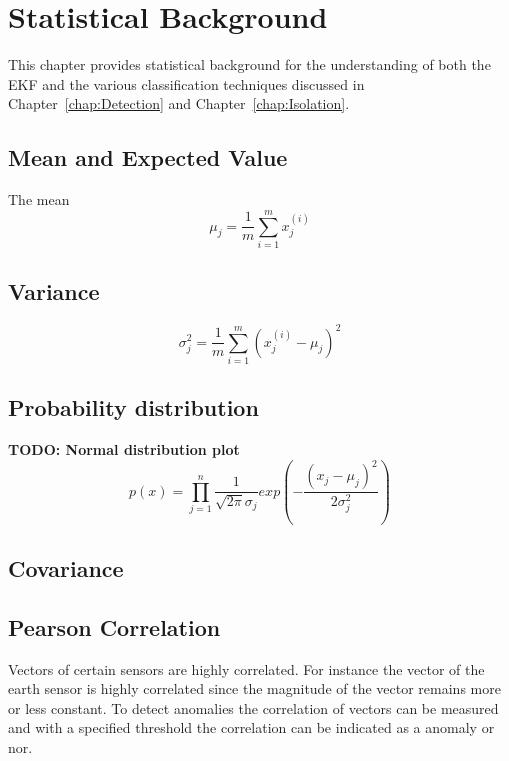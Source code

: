 \chapter{Statistical Background}
\label{chap:StatsBack}

This chapter provides statistical background for the understanding of both the EKF and the various classification techniques discussed in Chapter~\ref{chap:Detection} and Chapter~\ref{chap:Isolation}.

\section{Mean and Expected Value}
The mean
\begin{equation}
\label{mean}
\mu_j = \frac{1}{m} \sum_{i=1}^{m}x_j^{(i)}
\end{equation}

\section{Variance}
\begin{equation}
\label{variance}
\sigma_j^2 = \frac{1}{m} \sum_{i=1}^{m}(x_j^{(i)} - \mu_j)^2
\end{equation}

\section{Probability distribution}
\textbf{TODO: Normal distribution plot}
\begin{equation}
\label{guassian distribution}
p(x) = \prod_{j=1}^{n} \frac{1}{\sqrt{2\pi}\sigma_j}exp(-\frac{(x_j-\mu_j)^2}{2\sigma_j^2})
\end{equation}

\section{Covariance}

\section{Pearson Correlation}
Vectors of certain sensors are highly correlated. For instance the vector of the earth sensor is highly correlated since the magnitude of the vector remains more or less constant. To detect anomalies the correlation of vectors can be measured and with a specified threshold the correlation can be indicated as a anomaly or nor.

